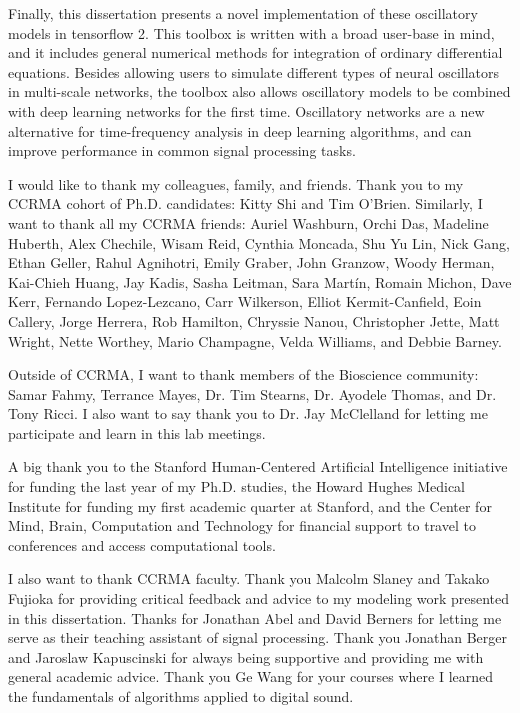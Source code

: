 \documentclass{report}
\begin{document}
Finally, this dissertation presents a novel implementation of these oscillatory models in tensorflow 2. This toolbox is written with a broad user-base in mind, and it includes general numerical methods for integration of ordinary differential equations. Besides allowing users to simulate different types of neural oscillators in multi-scale networks, the toolbox also allows oscillatory models to be combined with deep learning networks for the first time. Oscillatory networks are a new alternative for time-frequency analysis in deep learning algorithms, and can improve performance in common signal processing tasks.

I would like to thank my colleagues, family, and friends. Thank you to my CCRMA cohort of Ph.D. candidates: Kitty Shi and Tim O'Brien. Similarly, I want to thank all my CCRMA friends: Auriel Washburn, Orchi Das, Madeline Huberth, Alex Chechile, Wisam Reid, Cynthia Moncada, Shu Yu Lin, Nick Gang, Ethan Geller, Rahul Agnihotri, Emily Graber, John Granzow, Woody Herman, Kai-Chieh Huang, Jay Kadis, Sasha Leitman, Sara Mart\'{i}n, Romain Michon, Dave Kerr, Fernando Lopez-Lezcano, Carr Wilkerson, Elliot Kermit-Canfield, Eoin Callery, Jorge Herrera, Rob Hamilton, Chryssie Nanou, Christopher Jette, Matt Wright, Nette Worthey, Mario Champagne, Velda Williams, and Debbie Barney. 

Outside of CCRMA, I want to thank members of the Bioscience community: Samar Fahmy, Terrance Mayes, Dr. Tim Stearns, Dr. Ayodele Thomas, and Dr. Tony Ricci. I also want to say thank you to Dr. Jay McClelland for letting me participate and learn in this lab meetings.

A big thank you to the Stanford Human-Centered Artificial Intelligence initiative for funding the last year of my Ph.D. studies, the Howard Hughes Medical Institute for funding my first academic quarter at Stanford, and the Center for Mind, Brain, Computation and Technology for financial support to travel to conferences and access computational tools. 

I also want to thank CCRMA faculty. Thank you Malcolm Slaney and Takako Fujioka for providing critical feedback and advice to my modeling work presented in this dissertation. Thanks for Jonathan Abel and David Berners for letting me serve as their teaching assistant of signal processing. Thank you Jonathan Berger and Jaroslaw Kapuscinski for always being supportive and providing me with general academic advice. Thank you Ge Wang for your courses where I learned the fundamentals of algorithms applied to digital sound. 
\end{document}
